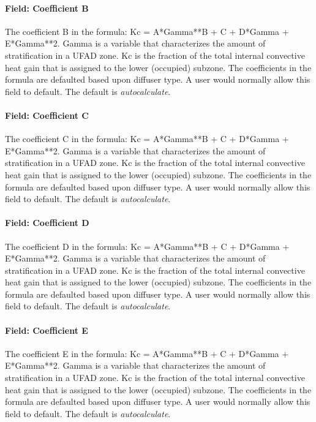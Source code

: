 \paragraph{Field: Coefficient B}\label{field-coefficient-b-1}

The coefficient B in the formula: Kc = A*Gamma**B + C + D*Gamma + E*Gamma**2. Gamma is a variable that characterizes the amount of stratification in a UFAD zone. Kc is the fraction of the total internal convective heat gain that is assigned to the lower (occupied) subzone. The coefficients in the formula are defaulted based upon diffuser type. A user would normally allow this field to default. The default is \emph{autocalculate}.

\paragraph{Field: Coefficient C}\label{field-coefficient-c-1}

The coefficient C in the formula: Kc = A*Gamma**B + C + D*Gamma + E*Gamma**2. Gamma is a variable that characterizes the amount of stratification in a UFAD zone. Kc is the fraction of the total internal convective heat gain that is assigned to the lower (occupied) subzone. The coefficients in the formula are defaulted based upon diffuser type. A user would normally allow this field to default. The default is \emph{autocalculate}.

\paragraph{Field: Coefficient D}\label{field-coefficient-d-1}

The coefficient D in the formula: Kc = A*Gamma**B + C + D*Gamma + E*Gamma**2. Gamma is a variable that characterizes the amount of stratification in a UFAD zone. Kc is the fraction of the total internal convective heat gain that is assigned to the lower (occupied) subzone. The coefficients in the formula are defaulted based upon diffuser type. A user would normally allow this field to default. The default is \emph{autocalculate}.

\paragraph{Field: Coefficient E}\label{field-coefficient-e-1}

The coefficient E in the formula: Kc = A*Gamma**B + C + D*Gamma + E*Gamma**2. Gamma is a variable that characterizes the amount of stratification in a UFAD zone. Kc is the fraction of the total internal convective heat gain that is assigned to the lower (occupied) subzone. The coefficients in the formula are defaulted based upon diffuser type. A user would normally allow this field to default. The default is \emph{autocalculate}.

